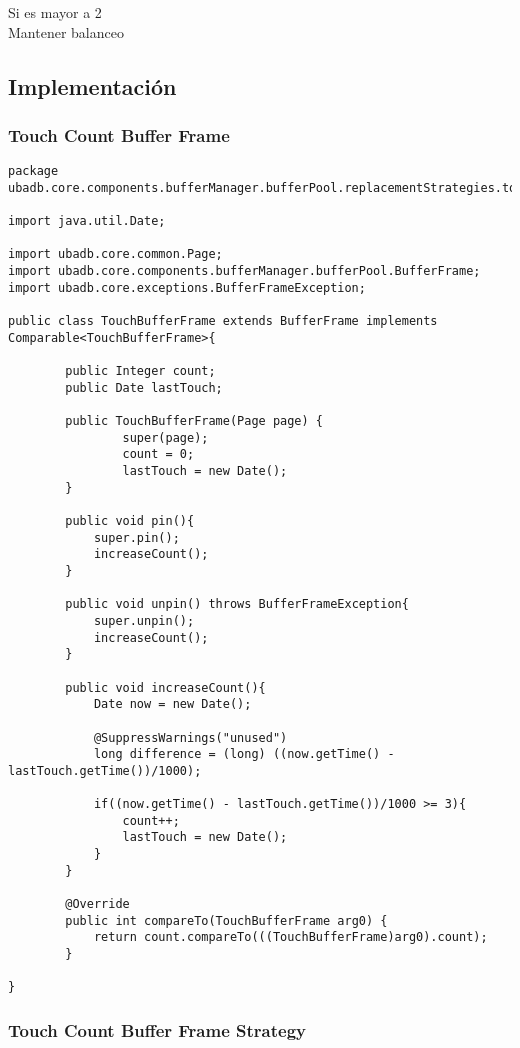Si es mayor a 2\\
Mantener balanceo\\

\subsection{Implementación}
\subsubsection{Touch Count Buffer Frame}

\begin{lstlisting}
package ubadb.core.components.bufferManager.bufferPool.replacementStrategies.touchcount;

import java.util.Date;

import ubadb.core.common.Page;
import ubadb.core.components.bufferManager.bufferPool.BufferFrame;
import ubadb.core.exceptions.BufferFrameException;

public class TouchBufferFrame extends BufferFrame implements Comparable<TouchBufferFrame>{
        
		public Integer count;
		public Date lastTouch;
	
        public TouchBufferFrame(Page page) {
                super(page);
                count = 0;
                lastTouch = new Date();
        }
        
        public void pin(){
        	super.pin();
        	increaseCount();
        }
        
        public void unpin() throws BufferFrameException{
        	super.unpin();
        	increaseCount();
        }
        
        public void increaseCount(){
        	Date now = new Date();
        	
        	@SuppressWarnings("unused")
			long difference = (long) ((now.getTime() - lastTouch.getTime())/1000);
        	
        	if((now.getTime() - lastTouch.getTime())/1000 >= 3){
        		count++;
        		lastTouch = new Date();
        	}
        }

		@Override
		public int compareTo(TouchBufferFrame arg0) {
			return count.compareTo(((TouchBufferFrame)arg0).count);
		}

}
\end{lstlisting}

\subsubsection{Touch Count Buffer Frame Strategy}

